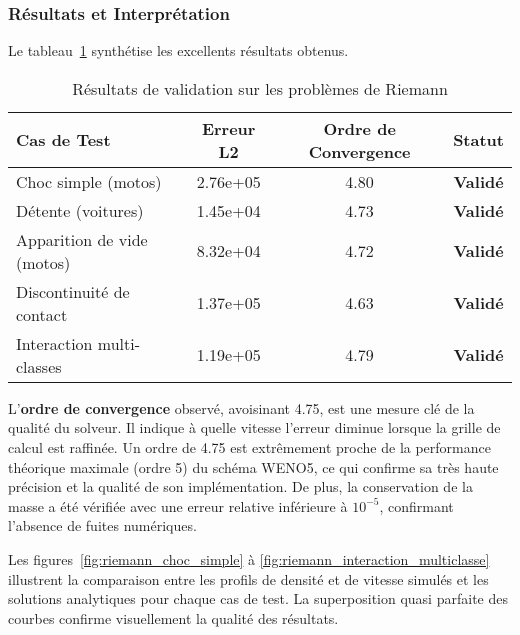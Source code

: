 \subsubsection{Résultats et Interprétation}

Le tableau~\ref{tab:riemann_validation_results} synthétise les excellents résultats obtenus.

\begin{table}[htbp]
  \centering
  \caption{Résultats de validation sur les problèmes de Riemann}
  \label{tab:riemann_validation_results}
  \begin{tabular}{|l|c|c|c|}
    \hline
    \textbf{Cas de Test}       & \textbf{Erreur L2} & \textbf{Ordre de Convergence} & \textbf{Statut} \\
    \hline
    Choc simple (motos)        & 2.76e+05           & 4.80                          & \textbf{Validé} \\
    Détente (voitures)         & 1.45e+04           & 4.73                          & \textbf{Validé} \\
    Apparition de vide (motos) & 8.32e+04           & 4.72                          & \textbf{Validé} \\
    Discontinuité de contact   & 1.37e+05           & 4.63                          & \textbf{Validé} \\
    Interaction multi-classes  & 1.19e+05           & 4.79                          & \textbf{Validé} \\
    \hline
  \end{tabular}
\end{table}
 
L'\textbf{ordre de convergence} observé, avoisinant 4.75, est une mesure clé de la qualité du solveur. Il indique à quelle vitesse l'erreur diminue lorsque la grille de calcul est raffinée. Un ordre de 4.75 est extrêmement proche de la performance théorique maximale (ordre 5) du schéma WENO5, ce qui confirme sa très haute précision et la qualité de son implémentation. De plus, la conservation de la masse a été vérifiée avec une erreur relative inférieure à $10^{-5}$, confirmant l'absence de fuites numériques.

Les figures~\ref{fig:riemann_choc_simple} à \ref{fig:riemann_interaction_multiclasse} illustrent la comparaison entre les profils de densité et de vitesse simulés et les solutions analytiques pour chaque cas de test. La superposition quasi parfaite des courbes confirme visuellement la qualité des résultats.


